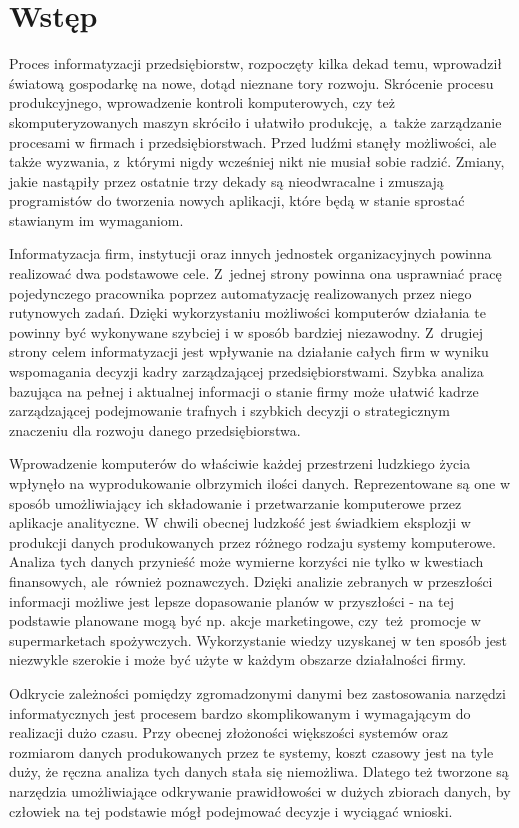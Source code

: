 \chapter{Wstęp}
Proces informatyzacji przedsiębiorstw, rozpoczęty kilka dekad temu, wprowadził światową gospodarkę na nowe, dotąd nieznane tory rozwoju. Skrócenie procesu produkcyjnego, wprowadzenie kontroli komputerowych, czy też skomputeryzowanych maszyn skróciło i ułatwiło produkcję,~a~także zarządzanie procesami w firmach i przedsiębiorstwach. Przed ludźmi stanęły możliwości, ale także wyzwania, z~którymi nigdy wcześniej nikt nie musiał sobie radzić. Zmiany, jakie nastąpiły przez ostatnie trzy dekady są nieodwracalne i zmuszają programistów do tworzenia nowych aplikacji, które będą w stanie sprostać stawianym im wymaganiom.

Informatyzacja firm, instytucji oraz innych jednostek organizacyjnych powinna realizować dwa podstawowe cele. Z~jednej strony powinna ona usprawniać pracę pojedynczego pracownika poprzez automatyzację realizowanych przez niego rutynowych zadań. Dzięki wykorzystaniu możliwości komputerów działania te powinny być wykonywane szybciej i w sposób bardziej niezawodny. Z~drugiej strony celem informatyzacji jest wpływanie na działanie całych firm w wyniku wspomagania decyzji kadry zarządzającej przedsiębiorstwami. Szybka analiza bazująca na pełnej i aktualnej informacji o stanie firmy może ułatwić kadrze zarządzającej podejmowanie trafnych i szybkich decyzji o strategicznym znaczeniu dla rozwoju danego przedsiębiorstwa.

Wprowadzenie komputerów do właściwie każdej przestrzeni ludzkiego życia wpłynęło na wyprodukowanie olbrzymich ilości danych. Reprezentowane są one w sposób umożliwiający ich składowanie i przetwarzanie komputerowe przez aplikacje analityczne. W chwili obecnej ludzkość jest świadkiem eksplozji w produkcji danych produkowanych przez różnego rodzaju systemy komputerowe. Analiza tych danych przynieść może wymierne korzyści nie tylko w kwestiach finansowych, ale~również poznawczych. Dzięki analizie zebranych w przeszłości informacji możliwe jest lepsze dopasowanie planów w przyszłości - na tej podstawie planowane mogą być np. akcje marketingowe, czy~też~promocje w supermarketach spożywczych. Wykorzystanie wiedzy uzyskanej w ten sposób jest niezwykle szerokie i może być użyte w każdym obszarze działalności firmy.

Odkrycie zależności pomiędzy zgromadzonymi danymi bez zastosowania narzędzi informatycznych jest procesem bardzo skomplikowanym i wymagającym do realizacji dużo czasu. Przy obecnej złożoności większości systemów oraz rozmiarom danych produkowanych przez te systemy, koszt czasowy jest na tyle duży, że ręczna analiza tych danych stała się niemożliwa. Dlatego też tworzone są narzędzia umożliwiające odkrywanie prawidłowości w dużych zbiorach danych, by człowiek na tej podstawie mógł podejmować decyzje i wyciągać wnioski.

